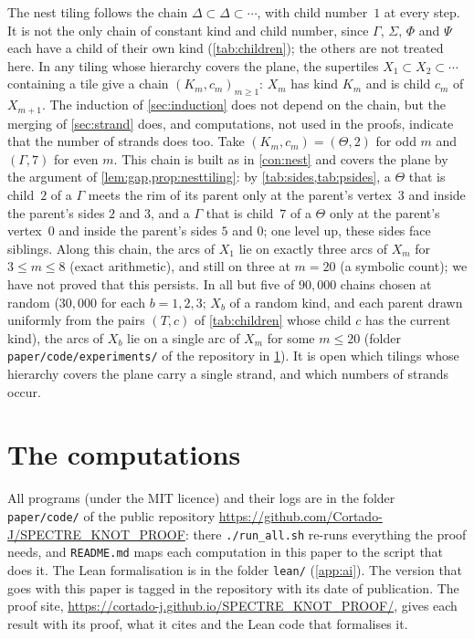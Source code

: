 \documentclass[11pt]{amsart}
\theoremstyle{definition}
\theoremstyle{remark}
\newcommand{\code}[1]{\texttt{#1}}
\begin{document}
The nest tiling follows the chain $\Delta\subset\Delta\subset\cdots$, with child number~$1$ at every step. It is not
the only chain of constant kind and child number, since $\Gamma$, $\Sigma$, $\Phi$ and $\Psi$ each have a child of their
own kind (\cref{tab:children}); the others are not treated here. In any tiling
whose hierarchy covers the plane, the supertiles $X_1\subset X_2\subset\cdots$ containing a tile give a chain
$(K_m,c_m)_{m\ge1}$: $X_m$ has kind $K_m$ and is child $c_m$ of $X_{m+1}$. The induction of \cref{sec:induction} does
not depend on the chain, but the merging of \cref{sec:strand} does, and computations, not used in the proofs, indicate
that the number of strands does too. Take $(K_m,c_m)=(\Theta,2)$ for odd $m$ and $(\Gamma,7)$ for even $m$. This chain
is built as in \cref{con:nest} and covers the plane by the argument of \cref{lem:gap,prop:nesttiling}: by
\cref{tab:sides,tab:psides}, a $\Theta$ that is child~$2$ of a $\Gamma$ meets the rim of its parent only at the parent's
vertex~$3$ and inside the parent's sides $2$ and $3$, and a $\Gamma$ that is child~$7$ of a $\Theta$ only at the
parent's vertex~$0$ and inside the parent's sides $5$ and $0$; one level up, these sides face siblings. Along this
chain, the arcs of $X_1$ lie on exactly three arcs of $X_m$ for
$3\le m\le8$ (exact arithmetic), and still on three at $m=20$ (a symbolic count); we have not proved that this
persists. In all but five of $90{,}000$ chains chosen at random ($30{,}000$ for each $b=1,2,3$; $X_b$ of a random kind,
and each parent drawn uniformly from the pairs $(T,c)$ of \cref{tab:children} whose child $c$ has the current kind),
the arcs of $X_b$ lie on a single arc of $X_m$ for some $m\le20$ (folder \code{paper/code/experiments/} of the
repository in \cref{app:computations}). It is open which tilings whose hierarchy covers the plane carry a single
strand, and which numbers of strands occur.

\appendix
\section{The computations}\label{app:computations}

All programs (under the MIT licence) and their logs are in the folder \code{paper/code/} of the public repository
\url{https://github.com/Cortado-J/SPECTRE_KNOT_PROOF}: there \code{./run\_all.sh} re-runs everything the proof needs,
and \code{README.md} maps each computation in this paper to the script that does it. The Lean formalisation is in the
folder \code{lean/} (\cref{app:ai}). The version that goes with this paper is tagged in the repository with its date of
publication. The proof site, \url{https://cortado-j.github.io/SPECTRE_KNOT_PROOF/}, gives each result with its proof,
what it cites and the Lean code that formalises it.
\end{document}
